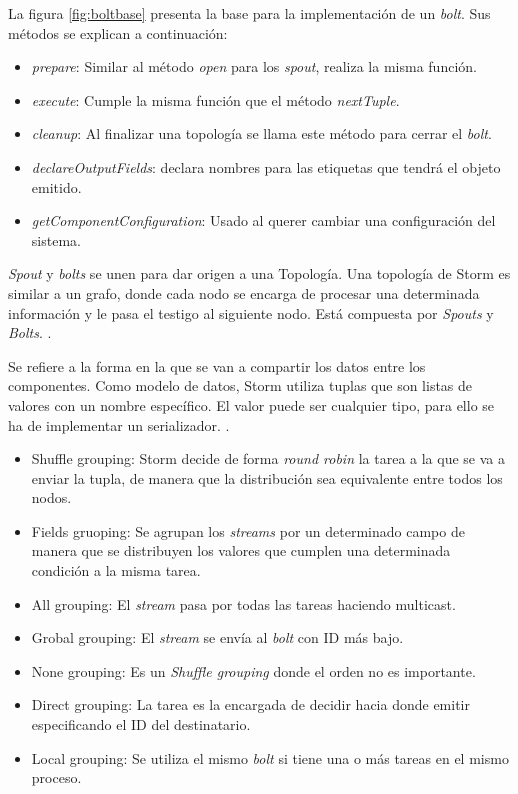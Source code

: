 La figura \ref{fig:boltbase} presenta la base para la implementación de un \textit{bolt}. Sus métodos se explican a continuación:

\begin{itemize}
\item \textit{prepare}: Similar al método \textit{open} para los \textit{spout}, realiza la misma función.
\item \textit{execute}: Cumple la misma función que el método \textit{nextTuple}.
\item \textit{cleanup}: Al finalizar una topología se llama este método para cerrar el \textit{bolt}.
\item \textit{declareOutputFields}: declara nombres para las etiquetas que tendrá el objeto emitido.
\item \textit{getComponentConfiguration}: Usado al querer cambiar una configuración del sistema.
\end{itemize}

\textit{Spout} y \textit{bolts} se unen para dar origen a una Topología. Una topología de Storm es similar a un grafo, donde cada nodo se encarga de procesar una determinada información y le pasa el testigo al siguiente nodo. Está compuesta por \textit{Spouts} y \textit{Bolts}. \cite{Storm}.

Se refiere a la forma en la que se van a compartir los datos entre los componentes. Como modelo de datos, Storm utiliza tuplas que son listas de valores con un nombre específico. El valor puede ser cualquier tipo, para ello se ha de implementar un serializador. \cite{Storm}.

\begin{itemize}
\item Shuffle grouping: Storm decide de forma \textit{round robin} la tarea a la que se va a enviar la tupla, de manera que la distribución sea equivalente entre todos los nodos.
\item Fields gruoping: Se agrupan los \textit{streams} por un determinado campo de manera que se distribuyen los valores que cumplen una determinada condición a la misma tarea.
\item All grouping: El \textit{stream} pasa por todas las tareas haciendo multicast.
\item Grobal grouping: El \textit{stream} se envía al \textit{bolt} con ID más bajo.
\item None grouping: Es un \textit{Shuffle grouping} donde el orden no es importante.
\item Direct grouping: La tarea es la encargada de decidir hacia donde emitir especificando el ID del destinatario.
\item Local grouping: Se utiliza el mismo \textit{bolt} si tiene una o más tareas en el mismo proceso.
\end{itemize}

